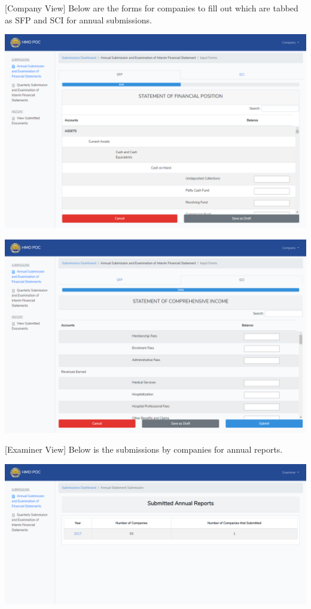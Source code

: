 \documentclass{article}
\begin{document}
[Company View] Below are the forms for companies to
fill out which are tabbed as SFP and SCI for annual submissions.%

\includegraphics[keepaspectratio=true]{up-ic-screens/image217}{}%

\includegraphics[keepaspectratio=true]{up-ic-screens/image115}{}%

[Examiner View] Below is the submissions by companies
for annual reports.%

\includegraphics[keepaspectratio=true]{up-ic-screens/image53}{}%
\end{document}
